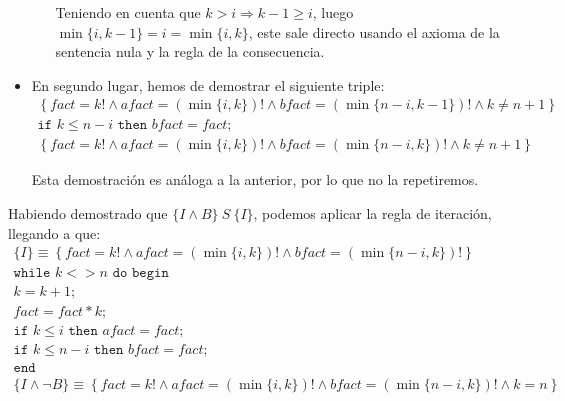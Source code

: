 \begin{ejercicio}
\begin{itemize}
\begin{itemize}
            Teniendo en cuenta que $k>i \Longrightarrow k-1 \geq i$, luego $\min\{i,k-1\} = i = \min\{i,k\}$, este sale directo usando el axioma de la sentencia nula y la regla de la consecuencia.
        \end{itemize}

        \item En segundo lugar, hemos de demostrar el siguiente triple:
        \begin{gather*}
            \left\{fact = k! \land afact = (\min\{i,k\})! \land bfact = (\min\{n-i,k-1\})! \land k \neq n+1\right\} \\
            \texttt{if\ } k \leq n-i \texttt{\ then\ } bfact = fact; \\
            \left\{fact = k! \land afact = (\min\{i,k\})! \land bfact = (\min\{n-i,k\})! \land k \neq n+1\right\}
        \end{gather*}

        Esta demostración es análoga a la anterior, por lo que no la repetiremos.        
    \end{itemize}

    Habiendo demostrado que $\{I \land B\}\ S\ \{I\}$, podemos aplicar la regla de iteración, llegando a que:
    \begin{gather*}
        \{I\} \equiv \left\{fact = k! \land afact = (\min\{i,k\})! \land bfact = (\min\{n-i,k\})!\right\} \\
        \texttt{while\ } k <> n \texttt{\ do\ begin} \\
        k = k + 1; \\
        fact = fact * k; \\
        \texttt{if\ } k \leq i \texttt{\ then\ } afact = fact; \\
        \texttt{if\ } k \leq n-i \texttt{\ then\ } bfact = fact; \\
        \texttt{end} \\
        \{I \land \lnot B\} \equiv \left\{fact = k! \land afact = (\min\{i,k\})! \land bfact = (\min\{n-i,k\})! \land k=n\right\}
    \end{gather*}


\end{ejercicio}

